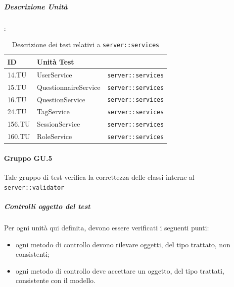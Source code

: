 \documentclass[12pt,a4paper]{article}
\begin{document}
	\subparagraph{Descrizione Unità}:
	
	\begin{table}[H]
		\begin{center}
			\begin{tabular}{p{} p{0.4\textwidth} p{}}
				\toprule
				\textbf{ID}   & \textbf{Unità Test}	& \textbf{\mgls{package}} \\ \midrule
				\midrule
				14.TU & UserService & \texttt{server::services}\\ \midrule
				15.TU & QuestionnaireService & \texttt{server::services}\\ \midrule
				16.TU & QuestionService & \texttt{server::services}\\ \midrule
				24.TU & TagService & \texttt{server::services}\\ \midrule
				156.TU & SessionService & \texttt{server::services}\\ \midrule
				160.TU & RoleService & \texttt{server::services}\\ \midrule			
				\bottomrule
			\end{tabular}
		\end{center}
		\caption{Descrizione dei test relativi a \texttt{server::services}}
	\end{table}
	
	\paragraph{Gruppo GU.5}
	Tale gruppo di test verifica la correttezza delle classi interne al  \texttt{server::validator}
	
	\subparagraph{Controlli oggetto del test}
	Per ogni unità  qui definita, devono essere verificati i seguenti punti:
	
	\begin{itemize}
		\item ogni metodo di controllo devono rilevare oggetti, del tipo trattato, non consistenti;
		\item ogni metodo di controllo deve accettare un oggetto, del tipo trattati, consistente con il modello.
	\end{itemize}
	
\end{document}
